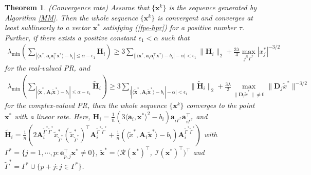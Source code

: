 \documentclass{article}
\newtheorem{theorem}{Theorem}[section]
\numberwithin{equation}{section}
\begin{document}
\begin{theorem}\label{conv-who} (Convergence rate)
Assume that $\{\mathbf{x}^k\}$ is the sequence generated by Algorithm \ref{MM}. Then the whole sequence $\{\mathbf{x}^k\}$ is convergent and converges at least sublinearly to a vector $\mathbf{x}^*$ satisfying (\ref{fpe-hpr}) for a positive number $\tau$. Further, if there exists a positive constant $\epsilon_1<\alpha$ such that
{\small\begin{equation}\label{gene-jaciban-pos-real}
		\begin{aligned}
		\lambda_{\mathrm{min}}(\sum_{|\langle\mathbf{x}^*,\mathbf{a}_i\mathbf{a}_i^{\top}\mathbf{x}^*\rangle-b_i|\leq\alpha-\epsilon_1}\mathbf{H}_i)\geq	3\sum_{\big||\langle\mathbf{x}^*,\mathbf{a}_i\mathbf{a}_i^{\top}\mathbf{x}^*\rangle-b_i|-\alpha\big|<\epsilon_1}\|\mathbf{H}_i\|_2+
			\frac{3\lambda}{4}\max_{j^\in\Gamma^*}|x_j^*|^{-3/2}
\end{aligned}\end{equation}}
for the real-valued PR, and
{\small\begin{equation}\label{gene-jaciban-pos-com}
\begin{aligned}
\lambda_{\mathrm{min}}(\sum_{|\langle\tilde{\mathbf{x}}^*,\mathbf{A}_i\tilde{\mathbf{x}}^*\rangle-b_i|\leq\alpha-\epsilon_1}
\widetilde{\mathbf{H}}_i)\geq 3\sum_{\big||\langle\tilde{\mathbf{x}}^*,\mathbf{A}_i\tilde{\mathbf{x}}^*\rangle-b_i|-\alpha\big|<\epsilon_1}
\|\widetilde{\mathbf{H}}_i\|_2 +\frac{3\lambda}{2}\max_{\|\mathbf{D}_j\tilde{x}^*\|\neq0}\|\mathbf{D}_j\tilde{x}^*\|^{-3/2}
\end{aligned}
\end{equation}}
for the complex-valued PR, then the whole sequence $\{\mathbf{x}^k\}$ converges to the point $\mathbf{x}^*$ with a linear rate.
Here, $\mathbf{H}_i=\frac{1}{n}(3\langle\mathbf{a}_i,\mathbf{x}^*\rangle^2-b_i)
\mathbf{a}_{i\Gamma^*}\mathbf{a}_{i\Gamma^*}^\top$ and $\widetilde{\mathbf{H}}_i=\frac{1}{n}(2\mathbf{A}_i^{\tilde{\Gamma}^*\tilde{\Gamma}^*}\tilde{x}_{\tilde{\Gamma}^*}^{*}(\tilde{x}_{\tilde{\Gamma}^*}^{*})^\top
\mathbf{A}_i^{\tilde{\Gamma}^*\tilde{\Gamma}^*}+\frac{1}{n}(\langle\tilde{x}^*,\mathbf{A}_i\tilde{\mathbf{x}}^*\rangle-b_i)
\mathbf{A}_i^{\tilde{\Gamma}^*\tilde{\Gamma}^*})$ with $\Gamma^*=\{j=1,\cdots,p: \mathbf{e}_{p,j}^\top \mathbf{x}^*\neq0\}$,  $\tilde{\mathbf{x}}^*=( \mathcal{R}(\mathbf{x}^*)^\top$, $\mathcal{I}(\mathbf{x}^*)^\top)^\top$ and $\tilde{\Gamma}^*=\Gamma^*\cup\{p+j: j\in\Gamma^*\}$.
\end{theorem}
\end{document}

